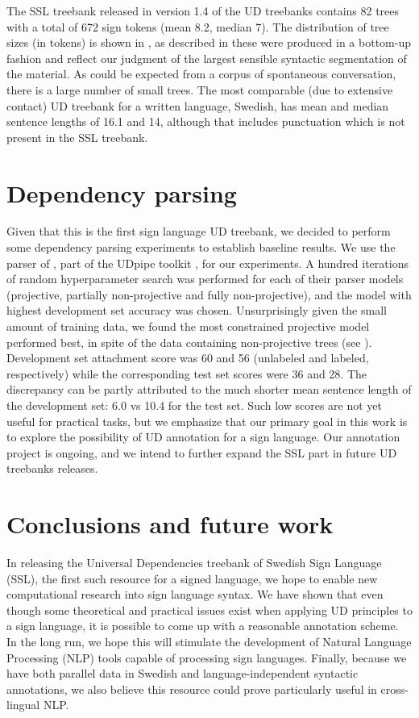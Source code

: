 \documentclass[11pt]{article}
\begin{document}
The SSL treebank released in version 1.4 of the UD treebanks
contains 82 trees with a total of 672 sign tokens (mean 8.2, median 7).
The distribution of tree sizes (in tokens) is shown in ,
as described in  these were produced in a bottom-up
fashion and reflect our judgment of the largest sensible syntactic
segmentation of the material.
As could be expected from a corpus of spontaneous conversation, there is a
large number of small trees. The most comparable (due to extensive contact)
UD treebank for a written language, Swedish, has mean and median sentence
lengths of 16.1 and 14, although that includes punctuation which is not
present in the SSL treebank.

\section{Dependency parsing}

Given that this is the first sign language UD treebank, we decided to perform
some dependency parsing experiments to establish baseline results.
We use the parser of , part of the UDpipe
toolkit \cite{Straka2016udpipe}, for our experiments.
A hundred iterations of random hyperparameter search was performed for each of
their parser models (projective, partially non-projective and fully
non-projective), and the model with highest development set accuracy was
chosen.
Unsurprisingly given the small amount of training data, we found the most
constrained projective model performed best, in spite of the data containing
non-projective trees (see ).
Development set attachment score was 60 and 56 (unlabeled and labeled,
respectively) while the corresponding test set scores were 36 and
28. The discrepancy can be partly attributed to the much shorter mean
sentence length of the development set: 6.0 vs 10.4 for the test set.
Such low scores are not yet useful for practical tasks, but we emphasize that
our primary goal in this work is to explore the possibility of UD annotation
for a sign language. Our annotation project is ongoing, and we intend to
further expand the SSL part in future UD treebanks releases.

\section{Conclusions and future work}

In releasing the Universal Dependencies treebank of Swedish Sign Language
(SSL), the first such resource for a signed language,
we hope to enable new computational research into sign language syntax.
We have shown that even though some theoretical and practical issues exist
when applying UD principles to a sign language, it is possible to come up with
a reasonable annotation scheme. In the long run, we hope this will
stimulate the development of Natural
Language Processing (NLP) tools capable of processing sign languages.
Finally, because we have both parallel data in Swedish and language-independent
syntactic annotations, we also believe this resource could prove particularly
useful in cross-lingual NLP.


%



\end{document}
